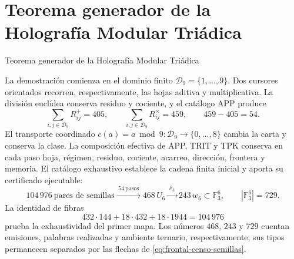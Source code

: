 \chapter*{Teorema generador de la Holografía Modular Triádica}
%
{Teorema generador de la Holografía Modular Triádica}

La demostración comienza en el dominio finito
\(\mathcal D_9=\{1,\ldots,9\}\). Dos cursores orientados recorren,
respectivamente, las hojas aditiva y multiplicativa. La división euclídea
conserva residuo y cociente, y el catálogo APP produce
\[
 \sum_{i,j\in\mathcal D_9}R^+_{ij}=405,
 \qquad
 \sum_{i,j\in\mathcal D_9}R^\times_{ij}=459,
 \qquad 459-405=54.
\]
El transporte coordinado
\(c(a)=a\bmod9:\mathcal D_9\to\{0,\ldots,8\}\)
cambia la carta y conserva la clase. La composición efectiva de APP, TRIT y
TPK conserva en cada paso hoja, régimen, residuo, cociente, acarreo,
dirección, frontera y memoria. El catálogo exhaustivo establece la cadena
finita inicial y aporta su certificado ejecutable:
\begin{equation}
\boxed{
104\,976\ \text{pares de semillas}
\xrightarrow{\;54\ \text{pasos}\;}
468\,U_6
\xrightarrow{\;\rho_3\;}
243\,w_6\subset\mathbb F_3^6,
\qquad |\mathbb F_3^6|=729.}
\label{eq:frontal-censo-semillas}
\end{equation}
La identidad de fibras
\[
432\cdot144+18\cdot432+18\cdot1944=104\,976
\]
prueba la exhaustividad del primer mapa. Los números \(468\), \(243\) y
\(729\) cuentan emisiones, palabras realizadas y ambiente ternario,
respectivamente; sus tipos permanecen separados por las flechas de
\eqref{eq:frontal-censo-semillas}.

